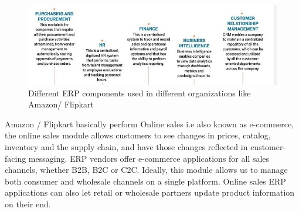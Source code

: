 \documentclass[a4paper]{article}
\begin{document}
\begin{figure}[h]
  \centering
  \includegraphics[scale=0.5]{erpcomp}
  \caption{Different ERP components used in different organizations like Amazon/ Flipkart}
\end{figure}

Amazon / Flipkart basically perform Online sales i.e  also known as e-commerce, the online sales module allows customers to see changes in prices, catalog, inventory and the supply chain, and have those changes reflected in customer-facing messaging. ERP vendors offer e-commerce applications for all sales channels, whether B2B, B2C or C2C. Ideally, this module allows us to manage both consumer and wholesale channels on a single platform. Online sales ERP applications can also let retail or wholesale partners update product information on their end.
\end{document}
